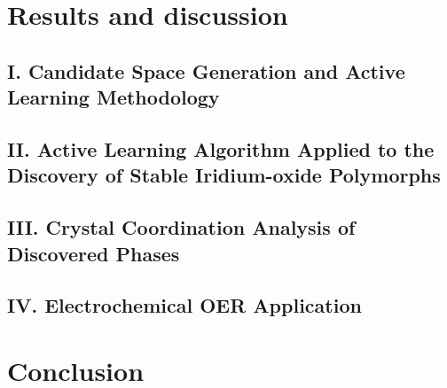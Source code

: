 \section{Results and discussion}

  \subsection{I. Candidate Space Generation and Active Learning Methodology}
  

  \subsection{II. Active Learning Algorithm Applied to the Discovery of Stable Iridium-oxide Polymorphs}
  

  \subsection{III. Crystal Coordination Analysis of Discovered Phases}
  

  \subsection{IV. Electrochemical OER Application}
  


\section{Conclusion}


\begin{acknowledgement}

\end{acknowledgement}



